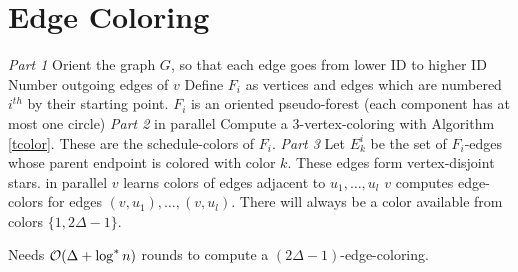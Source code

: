 \documentclass[11pt, oneside]{book}   						%
\begin{document}
\begin{algorithm}
\caption{}\label{unrooted}
\end{algorithm}

\section{Edge Coloring}
\textbf{}
\begin{algorithm}[H]
\caption{}\label{edgecolor}
\begin{algorithmic}[1]
\Statex \textit{Part 1}
\State Orient the graph $G$, so that each edge goes from lower ID to higher ID
\ForEach[node $v$]
	\State Number outgoing edges of $v$
\EndForEach
\State Define $F_i$ as vertices and edges which are numbered $i^{th}$ by their starting point.
\State $F_i$ is an oriented pseudo-forest (each component has at most one circle)
\Statex
\Statex \textit{Part 2}
\ForEach[$F_i$] in parallel
	\State Compute a 3-vertex-coloring with Algorithm \ref{tcolor}.
	\State These are the schedule-colors of $F_i$.
\EndForEach
\Statex
\Statex \textit{Part 3}
	\State Let $E_k^i$ be the set of $F_i$-edges whose parent endpoint is colored with color $k$. 
	\State These edges form vertex-disjoint stars.
	 in parallel
		\State $v$ learns colors of edges adjacent to $u_1,\hdots, u_l$
		\State $v$ computes edge-colors for edges $(v,u_1),\hdots,(v,u_l)$. There will always be a color available from colors $\{1,2\}$.
	\EndForEach
\EndFor
\end{algorithmic}
\end{algorithm}
\begin{mythm} Needs $(\Delta +\log^* n)$ rounds to compute a $(2)$-edge-coloring.\end{mythm}
\end{document}
